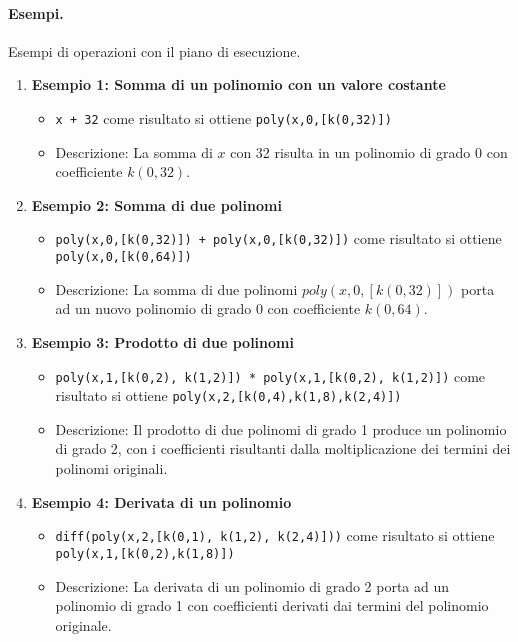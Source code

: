 \documentclass[12pt,twoside]{report}
\begin{document}
\paragraph{Esempi.} 


Esempi di operazioni con il piano di esecuzione.


\begin{enumerate}
    \item \textbf{Esempio 1: Somma di un polinomio con un valore costante}
    \begin{itemize}
        \item \texttt{x + 32} come risultato si ottiene  \texttt{poly(x,0,[k(0,32)])}
        \item Descrizione: La somma di \( x \) con 32 risulta in un polinomio di grado 0 con coefficiente \( k(0, 32) \).
    \end{itemize}
    
    \item \textbf{Esempio 2: Somma di due polinomi}
    \begin{itemize}
        \item \texttt{poly(x,0,[k(0,32)]) + poly(x,0,[k(0,32)])} come risultato si ottiene \texttt{poly(x,0,[k(0,64)])}
        \item Descrizione: La somma di due polinomi \( poly(x, 0, [k(0,32)]) \) porta ad un nuovo polinomio di grado 0 con coefficiente \( k(0, 64) \).
    \end{itemize}
    
    \item \textbf{Esempio 3: Prodotto di due polinomi}
    \begin{itemize}
        \item \texttt{poly(x,1,[k(0,2), k(1,2)]) * poly(x,1,[k(0,2), k(1,2)])} come risultato si ottiene \texttt{poly(x,2,[k(0,4),k(1,8),k(2,4)])}
        \item Descrizione: Il prodotto di due polinomi di grado 1 produce un polinomio di grado 2, con i coefficienti risultanti dalla moltiplicazione dei termini dei polinomi originali.
    \end{itemize}
    
    \item \textbf{Esempio 4: Derivata di un polinomio}
    \begin{itemize}
        \item \texttt{diff(poly(x,2,[k(0,1), k(1,2), k(2,4)]))} come risultato si ottiene \texttt{poly(x,1,[k(0,2),k(1,8)])}
        \item Descrizione: La derivata di un polinomio di grado 2 porta ad un polinomio di grado 1 con coefficienti derivati dai termini del polinomio originale.
    \end{itemize}
\end{enumerate}
\end{document}
